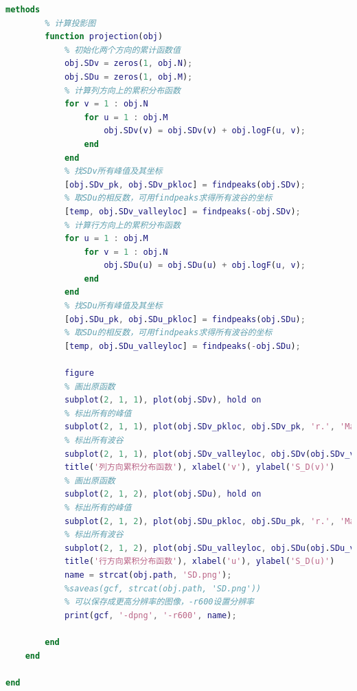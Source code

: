 \documentclass[UTF8]{ctexart}
\begin{document}
\begin{lstlisting}[language=Matlab,caption={$remove\_waves$类},label={broadcast.cpp}]
    methods
        % 计算投影图
        function projection(obj)
            % 初始化两个方向的累计函数值
            obj.SDv = zeros(1, obj.N);
            obj.SDu = zeros(1, obj.M);
            % 计算列方向上的累积分布函数
            for v = 1 : obj.N
                for u = 1 : obj.M
                    obj.SDv(v) = obj.SDv(v) + obj.logF(u, v);
                end
            end
            % 找SDv所有峰值及其坐标
            [obj.SDv_pk, obj.SDv_pkloc] = findpeaks(obj.SDv);
            % 取SDu的相反数，可用findpeaks求得所有波谷的坐标
            [temp, obj.SDv_valleyloc] = findpeaks(-obj.SDv);
            % 计算行方向上的累积分布函数
            for u = 1 : obj.M
                for v = 1 : obj.N
                    obj.SDu(u) = obj.SDu(u) + obj.logF(u, v);
                end
            end
            % 找SDu所有峰值及其坐标
            [obj.SDu_pk, obj.SDu_pkloc] = findpeaks(obj.SDu);
            % 取SDu的相反数，可用findpeaks求得所有波谷的坐标
            [temp, obj.SDu_valleyloc] = findpeaks(-obj.SDu);
            
            figure
            % 画出原函数
            subplot(2, 1, 1), plot(obj.SDv), hold on 
            % 标出所有的峰值
            subplot(2, 1, 1), plot(obj.SDv_pkloc, obj.SDv_pk, 'r.', 'Markersize', 2), hold on
            % 标出所有波谷
            subplot(2, 1, 1), plot(obj.SDv_valleyloc, obj.SDv(obj.SDv_valleyloc), 'g.', 'Markersize', 2)
            title('列方向累积分布函数'), xlabel('v'), ylabel('S_D(v)')
            % 画出原函数
            subplot(2, 1, 2), plot(obj.SDu), hold on
            % 标出所有的峰值
            subplot(2, 1, 2), plot(obj.SDu_pkloc, obj.SDu_pk, 'r.', 'Markersize', 2), hold on
            % 标出所有波谷
            subplot(2, 1, 2), plot(obj.SDu_valleyloc, obj.SDu(obj.SDu_valleyloc), 'g.', 'Markersize', 2)
            title('行方向累积分布函数'), xlabel('u'), ylabel('S_D(u)')
            name = strcat(obj.path, 'SD.png');
            %saveas(gcf, strcat(obj.path, 'SD.png'))
            % 可以保存成更高分辨率的图像，-r600设置分辨率
            print(gcf, '-dpng', '-r600', name);
            
        end
    end
            
end

              \end{lstlisting}
    
\end{document}
